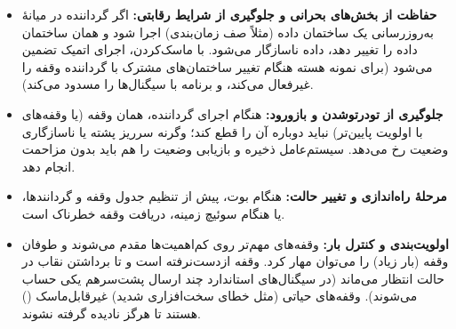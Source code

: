 \begin{itemize}
  \item \textbf{حفاظت از بخش‌های بحرانی و جلوگیری از شرایط رقابتی:} اگر گرداننده در میانهٔ به‌روزرسانی یک ساختمان داده (مثلاً صف زمان‌بندی) اجرا شود و همان ساختمان داده را تغییر دهد، داده ناسازگار می‌شود. با ماسک‌کردن، اجرای اتمیک تضمین می‌شود (برای نمونه هسته هنگام تغییر ساختمان‌های مشترک با گرداننده وقفه را غیرفعال می‌کند، و برنامه با  سیگنال‌ها را مسدود می‌کند).
  \item \textbf{جلوگیری از تودرتوشدن و بازورود:} هنگام اجرای گرداننده، همان وقفه (یا وقفه‌های با اولویت پایین‌تر) نباید دوباره آن را قطع کند؛ وگرنه سرریز پشته یا ناسازگاری وضعیت رخ می‌دهد. سیستم‌عامل ذخیره و بازیابی وضعیت را هم باید بدون مزاحمت انجام دهد.
  \item \textbf{مرحلهٔ راه‌اندازی و تغییر حالت:} هنگام بوت، پیش از تنظیم جدول وقفه و گردانندها، یا هنگام سوئیچ زمینه، دریافت وقفه خطرناک است.
  \item \textbf{اولویت‌بندی و کنترل بار:} وقفه‌های مهم‌تر روی کم‌اهمیت‌ها مقدم می‌شوند و طوفان وقفه (بار زیاد) را می‌توان مهار کرد. وقفه ازدست‌نرفته است و تا برداشتن نقاب در حالت انتظار می‌ماند (در سیگنال‌های استاندارد چند ارسال پشت‌سرهم یکی حساب می‌شوند). وقفه‌های حیاتی (مثل خطای سخت‌افزاری شدید) غیرقابل‌ماسک () هستند تا هرگز نادیده گرفته نشوند.
\end{itemize}
